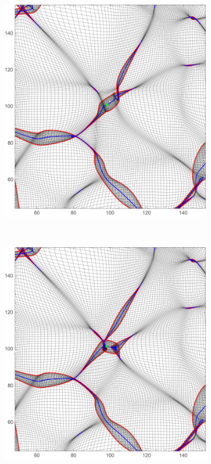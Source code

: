 \documentclass[a4paper, 11pt]{article}
\begin{document}
\begin{figure}
\begin{subfigure}[b]{0.31\textwidth}
\end{subfigure}~
\begin{subfigure}[b]{0.31\textwidth}
\includegraphics[width=\textwidth]{Rotation_Z_2}
\end{subfigure}~
\begin{subfigure}[b]{0.31\textwidth}
\includegraphics[width=\textwidth]{Rotation_Z_3}

\end{subfigure}
\end{figure}
\end{document}
